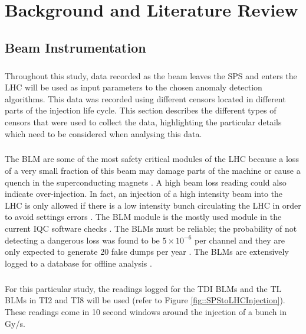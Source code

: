 \chapter{Background and Literature Review}


\section{Beam Instrumentation}
\label{sec::beam_instrumentation}
\paragraph{ }Throughout this study, data recorded as the beam leaves the \acs{SPS} and enters the \acs{LHC} will be used as input parameters to the chosen anomaly detection algorithms. This data was recorded using different censors located in different parts of the injection life cycle. This section describes the different types of censors that were used to collect the data, highlighting the particular details which need to be considered when analysing this data.

\paragraph{ }The \ac{BLM} are some of the most safety critical modules of the \acs{LHC} because a loss of a very small fraction of this beam may damage parts of the machine or cause a quench in the superconducting magnets \cite{Holzer2006}. A high beam loss reading could also indicate over-injection. In fact, an injection of a high intensity beam into the LHC is only allowed if there is a low intensity bunch circulating the LHC in order to avoid settings errors \cite{Kain2010}. The \acs{BLM} module is the mostly used module in the current IQC software checks \cite{Drosdal2011}. The \acs{BLM}s must be reliable; the probability of not detecting a dangerous loss was found to be $5\times10^{-6}$ per channel and they are only expected to generate 20 false dumps per year \cite{Holzer2006}. The \acs{BLM}s are extensively logged to a database for offline analysis \cite{Holzer2006}. 

\paragraph{ }For this particular study, the readings logged for the \ac{TDI} \acs{BLM}s and the \ac{TL} \acs{BLM}s in TI2 and TI8 will be used (refer to Figure \ref{fig::SPStoLHCInjection}). These readings come in 10 second windows around the injection of a bunch in \ac{Gy/s}.

